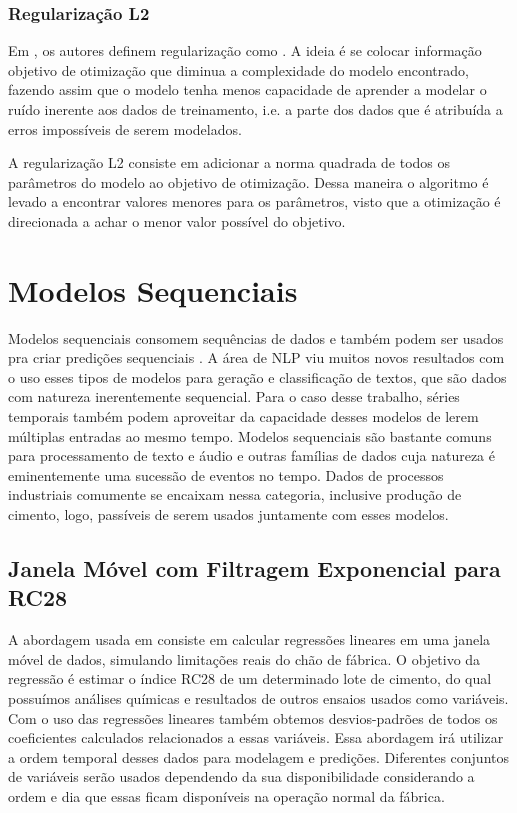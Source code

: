 \bigskip

\subsubsection{Regularização L2}

Em \cite{dlbook}, os autores definem regularização como . A ideia é se colocar informação objetivo de 
otimização que diminua a complexidade do modelo encontrado, fazendo assim
que o modelo tenha menos capacidade de aprender a modelar o ruído inerente
aos dados de treinamento, i.e. a parte dos dados que é atribuída a erros
impossíveis de serem modelados.

A regularização L2 consiste em adicionar a norma quadrada de todos os parâmetros
do modelo ao objetivo de otimização. Dessa maneira o algoritmo é levado a
encontrar valores menores para os parâmetros, visto que a otimização é
direcionada a achar o menor valor possível do objetivo.



\section{Modelos Sequenciais}

Modelos sequenciais consomem sequências de dados e também podem ser usados pra
criar predições sequenciais \citep{dlbook}. A área de NLP viu muitos novos
resultados com o uso esses tipos de modelos para geração e classificação de textos, que são dados com
natureza inerentemente sequencial. Para o caso desse trabalho, séries temporais também podem
aproveitar da capacidade desses modelos de lerem múltiplas entradas ao mesmo
tempo. Modelos sequenciais são bastante comuns para processamento de texto e
áudio e outras famílias de dados cuja natureza é eminentemente uma sucessão de
eventos no tempo. Dados de processos industriais comumente se encaixam nessa
categoria, inclusive produção de cimento, logo, passíveis de serem usados
juntamente com esses modelos.



\subsection{Janela Móvel com Filtragem Exponencial para RC28 }
\label{ses:ewma}

A abordagem usada em \cite{grecialin} consiste em calcular regressões lineares em
uma janela móvel de dados, simulando limitações reais do chão de fábrica. O
objetivo da regressão é estimar o índice RC28 de um determinado lote de cimento,
do qual possuímos análises químicas e resultados de outros ensaios usados como
variáveis. Com o uso das regressões lineares também obtemos desvios-padrões de
todos os coeficientes calculados relacionados a essas variáveis. Essa abordagem irá utilizar a ordem temporal desses dados para
modelagem e predições. Diferentes conjuntos de variáveis serão usados dependendo
da sua disponibilidade considerando a ordem e dia que essas ficam disponíveis na
operação normal da fábrica.

